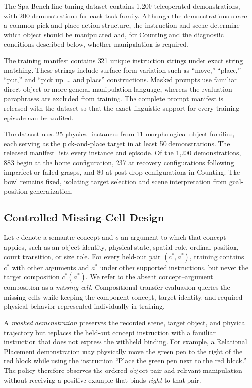 \documentclass[conference]{IEEEtran}
\begin{document}
The Spa-Bench fine-tuning dataset contains 1,200 teleoperated demonstrations, with 200 demonstrations for each task family. Although the demonstrations share a common pick-and-place action structure, the instruction and scene determine which object should be manipulated and, for Counting and the diagnostic conditions described below, whether manipulation is required.

The training manifest contains 321 unique instruction strings under exact string matching. These strings include surface-form variation such as ``move,'' ``place,'' ``put,'' and ``pick up~\ldots{} and place'' constructions. Masked prompts use familiar direct-object or more general manipulation language, whereas the evaluation paraphrases are excluded from training. The complete prompt manifest is released with the dataset so that the exact linguistic support for every training episode can be audited.

The dataset uses 25 physical instances from 11 morphological object
families, each serving as the pick-and-place target in at least 50
demonstrations. The released manifest lists every instance and episode.
Of the 1,200 demonstrations, 883 begin at the home configuration, 237 at
recovery configurations following imperfect or failed grasps, and 80 at
post-drop configurations in Counting. The bowl remains fixed, isolating
target selection and scene interpretation from goal-position generalization.

\subsection{Controlled Missing-Cell Design}

Let $c$ denote a semantic concept and $a$ an argument to which that concept applies, such as an object identity, physical state, spatial role, ordinal position, count transition, or size role. For every held-out pair $(c^{\ast},a^{\ast})$, training contains $c^{\ast}$ with other arguments and $a^{\ast}$ under other supported instructions, but never the target composition $c^{\ast}(a^{\ast})$. We refer to the absent concept--argument composition as a \emph{missing cell}. Compositional-transfer evaluation queries the missing cells while keeping the component concept, target identity, and required physical behavior represented individually in training.

A \emph{masked demonstration} preserves the recorded scene, target object, and physical trajectory but replaces the held-out concept instruction with a familiar instruction that does not express the withheld binding. For example, a Relational Placement demonstration may physically move the green pen to the right of the red block while using the instruction ``Place the green pen next to the red block.'' The policy therefore observes the ordered object pair and relevant manipulation without receiving a positive example that binds \emph{right} to that pair.
\end{document}
